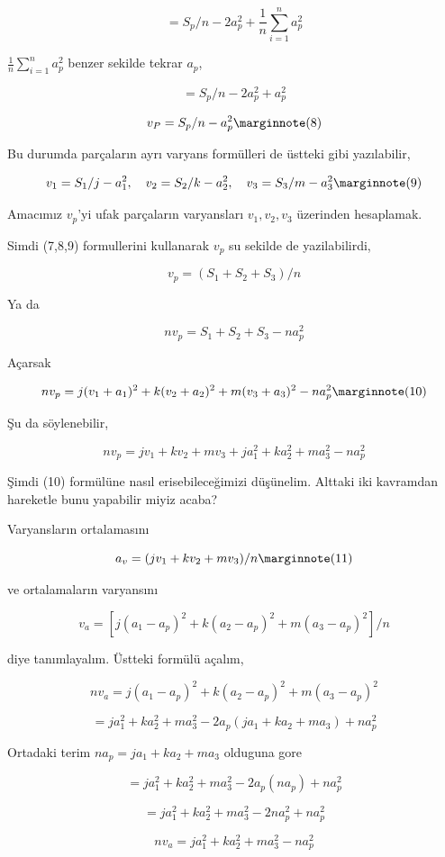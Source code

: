\documentclass[12pt,fleqn]{article}\usepackage{../../common}
\begin{document}
$$
= S_p / n  - 2 a_p^2 + \frac{1}{n} \sum_{i=1}^{n} a_p^2
$$

$\frac{1}{n} \sum_{i=1}^{n} a_p^2$ benzer sekilde tekrar $a_p$, 

$$
= S_p / n  - 2 a_p^2 +  a_p^2
$$

$$
v_P = S_p / n  -  a_p^2
\mlabel{8}
$$

Bu durumda parçaların ayrı varyans formülleri de üstteki gibi yazılabilir,

$$
v_1 = S_1 / j  -  a_1^2, \quad
v_2 = S_2 / k  -  a_2^2, \quad
v_3 = S_3 / m  -  a_3^2
\mlabel{9}
$$

Amacımız $v_p$'yi ufak parçaların varyansları $v_1,v_2,v_3$ üzerinden hesaplamak.

Simdi (7,8,9) formullerini kullanarak $v_p$ su sekilde de yazilabilirdi,

$$
v_p = (S_1 + S_2 + S_3) / n
$$

Ya da

$$
n v_p = S_1 + S_2 + S_3 - n a_p^2
$$

Açarsak

$$
n v_p = j (v_1 + a_1)^2 + k (v_2 + a_2)^2 + m (v_3 + a_3)^2 - n a_p^2
\mlabel{10}
$$

Şu da söylenebilir,

$$
n v_p = j v_1 + k v_2 + m v_3 + j a_1^2 + k a_2^2 + m a_3^2 - n a_p^2
$$

Şimdi (10) formülüne nasıl erisebileceğimizi düşünelim. Alttaki iki kavramdan
hareketle bunu yapabilir miyiz acaba?

Varyansların ortalamasını

$$
a_v = (j v_1 + k v_2 + m v_3) / n
\mlabel{11}
$$

ve ortalamaların varyansını

$$
v_a = [ j(a_1-a_p)^2 + k(a_2-a_p)^2 + m(a_3-a_p)^2 ] / n
$$

diye tanımlayalım. Üstteki formülü açalım,

$$
n v_a = j(a_1-a_p)^2 + k(a_2-a_p)^2 + m(a_3-a_p)^2 
$$

$$
= j a_1^2 + k a_2^2 + m a_3^2 - 2 a_p (ja_1 + ka_2 + ma_3) + n a_p^2
$$

Ortadaki terim $n a_p = ja_1 + ka_2 + ma_3$ olduguna gore

$$
= j a_1^2 + k a_2^2 + m a_3^2 - 2 a_p (n a_p) + n a_p^2
$$

$$
= j a_1^2 + k a_2^2 + m a_3^2 - 2 n a_p^2 + n a_p^2
$$

$$
n v_a = j a_1^2 + k a_2^2 + m a_3^2 - n a_p^2 
$$
\end{document}
